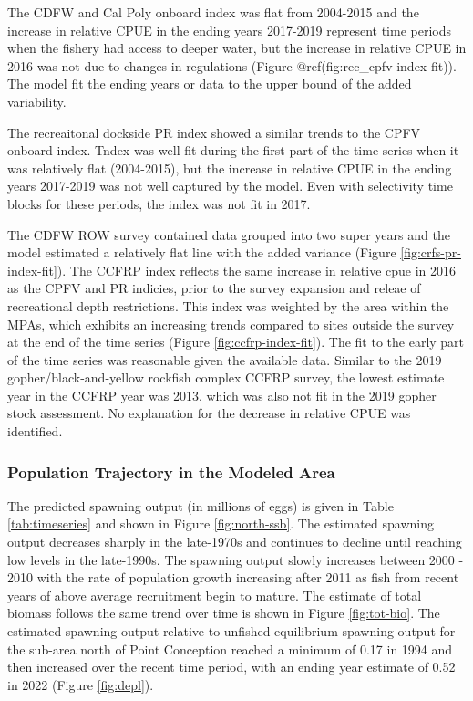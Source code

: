 \documentclass[11pt,
  english,
  letterpaper,
]{article}
\begin{document}
The CDFW and Cal Poly onboard index was flat from 2004-2015 and the increase in relative CPUE in the ending years 2017-2019 represent time periods when the fishery had access to deeper water, but the increase in relative CPUE in 2016 was not due to changes in regulations (Figure @ref(fig:rec\_cpfv-index-fit)). The model fit the ending years or data to the upper bound of the added variability.

The recreaitonal dockside PR index showed a similar trends to the CPFV onboard index. Tndex was well fit during the first part of the time series when it was relatively flat (2004-2015), but the increase in relative CPUE in the ending years 2017-2019 was not well captured by the model. Even with selectivity time blocks for these periods, the index was not fit in 2017.

The CDFW ROW survey contained data grouped into two super years and the model estimated a relatively flat line with the added variance (Figure \ref{fig:crfs-pr-index-fit}). The CCFRP index reflects the same increase in relative cpue in 2016 as the CPFV and PR indicies, prior to the survey expansion and releae of recreational depth restrictions. This index was weighted by the area within the MPAs, which exhibits an increasing trends compared to sites outside the survey at the end of the time series (Figure \ref{fig:ccfrp-index-fit}). The fit to the early part of the time series was reasonable given the available data. Similar to the 2019 gopher/black-and-yellow rockfish complex CCFRP survey, the lowest estimate year in the CCFRP year was 2013, which was also not fit in the 2019 gopher stock assessment. No explanation for the decrease in relative CPUE was identified.

\hypertarget{population-trajectory-in-the-modeled-area}{%
\subsubsection{Population Trajectory in the Modeled Area}\label{population-trajectory-in-the-modeled-area}}

The predicted spawning output (in millions of eggs) is given in Table \ref{tab:timeseries} and shown in Figure \ref{fig:north-ssb}. The estimated spawning output decreases sharply in the late-1970s and continues to decline until reaching low levels in the late-1990s. The spawning output slowly increases between 2000 - 2010 with the rate of population growth increasing after 2011 as fish from recent years of above average recruitment begin to mature. The estimate of total biomass follows the same trend over time is shown in Figure \ref{fig:tot-bio}. The estimated spawning output relative to unfished equilibrium spawning output for the sub-area north of Point Conception reached a minimum of 0.17 in 1994 and then increased over the recent time period, with an ending year estimate of 0.52 in 2022 (Figure \ref{fig:depl}).
\end{document}
